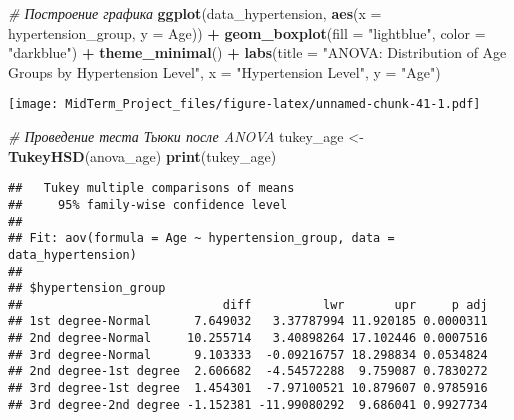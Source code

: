 \documentclass[
]{article}
\newenvironment{Shaded}{\begin{snugshade}}{\end{snugshade}}
\newcommand{\AttributeTok}[1]{\textcolor[rgb]{0.13,0.29,0.53}{#1}}
\newcommand{\CommentTok}[1]{\textcolor[rgb]{0.56,0.35,0.01}{\textit{#1}}}
\newcommand{\FunctionTok}[1]{\textcolor[rgb]{0.13,0.29,0.53}{\textbf{#1}}}
\newcommand{\NormalTok}[1]{#1}
\newcommand{\OtherTok}[1]{\textcolor[rgb]{0.56,0.35,0.01}{#1}}
\newcommand{\SpecialCharTok}[1]{\textcolor[rgb]{0.81,0.36,0.00}{\textbf{#1}}}
\newcommand{\StringTok}[1]{\textcolor[rgb]{0.31,0.60,0.02}{#1}}
\begin{document}
\begin{Shaded}
\begin{Highlighting}[]
\CommentTok{\# Построение графика}
\FunctionTok{ggplot}\NormalTok{(data\_hypertension, }\FunctionTok{aes}\NormalTok{(}\AttributeTok{x =}\NormalTok{ hypertension\_group, }\AttributeTok{y =}\NormalTok{ Age)) }\SpecialCharTok{+}
  \FunctionTok{geom\_boxplot}\NormalTok{(}\AttributeTok{fill =} \StringTok{"lightblue"}\NormalTok{, }\AttributeTok{color =} \StringTok{"darkblue"}\NormalTok{) }\SpecialCharTok{+}
  \FunctionTok{theme\_minimal}\NormalTok{() }\SpecialCharTok{+}
  \FunctionTok{labs}\NormalTok{(}\AttributeTok{title =} \StringTok{"ANOVA: Distribution of Age Groups by Hypertension Level"}\NormalTok{,}
       \AttributeTok{x =} \StringTok{"Hypertension Level"}\NormalTok{,}
       \AttributeTok{y =} \StringTok{"Age"}\NormalTok{)}
\end{Highlighting}
\end{Shaded}

\texttt{[image: MidTerm\_Project\_files/figure-latex/unnamed-chunk-41-1.pdf]}

\begin{Shaded}
\begin{Highlighting}[]
\CommentTok{\# Проведение теста Тьюки после ANOVA}
\NormalTok{tukey\_age }\OtherTok{\textless{}{-}} \FunctionTok{TukeyHSD}\NormalTok{(anova\_age)}
\FunctionTok{print}\NormalTok{(tukey\_age)}
\end{Highlighting}
\end{Shaded}

\begin{verbatim}
##   Tukey multiple comparisons of means
##     95% family-wise confidence level
## 
## Fit: aov(formula = Age ~ hypertension_group, data = data_hypertension)
## 
## $hypertension_group
##                            diff          lwr       upr     p adj
## 1st degree-Normal      7.649032   3.37787994 11.920185 0.0000311
## 2nd degree-Normal     10.255714   3.40898264 17.102446 0.0007516
## 3rd degree-Normal      9.103333  -0.09216757 18.298834 0.0534824
## 2nd degree-1st degree  2.606682  -4.54572288  9.759087 0.7830272
## 3rd degree-1st degree  1.454301  -7.97100521 10.879607 0.9785916
## 3rd degree-2nd degree -1.152381 -11.99080292  9.686041 0.9927734
\end{verbatim}
\end{document}
